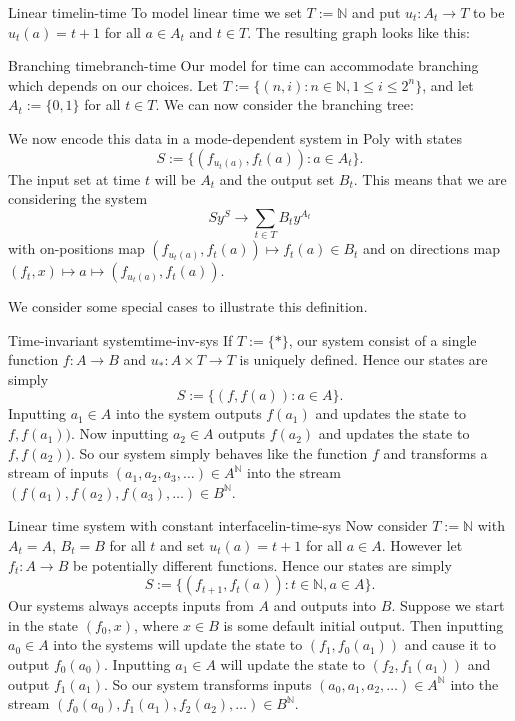 \documentclass[12pt, a4paper]{article}
\theoremstyle{definition}
\theoremstyle{plain}
\theoremstyle{plain}
\theoremstyle{plain}
\theoremstyle{plain}
\theoremstyle{plain}
\theoremstyle{remark}
\theoremstyle{remark}
\begin{document}
\begin{tcexample}{Linear time}{lin-time}
    To model linear time we set $T := \mathbb{N}$ and put $u_t : A_t \rightarrow T$ to be $u_t(a) = t+1$ for all $a \in A_t$ and $t \in T$. The resulting graph looks like this:


\end{tcexample}

\begin{tcexample}{Branching time}{branch-time}
    Our model for time can accommodate branching which depends on our choices. Let $T := \{(n,i) : n \in \mathbb{N}, 1 \leq i \leq 2^n \}$, and let $A_t := \{0,1\}$ for all $t \in T$. We can now consider the branching tree:

\end{tcexample}

We now encode this data in a mode-dependent system in \textsf{Poly} with states
$$ S := \{ (f_{u_t(a)}, f_t(a)) : a \in A_t \}.$$
The input set at time $t$ will be $A_t$ and the output set $B_t$. This means that we are considering the system
$$ S y^S \rightarrow \sum_{t \in T} B_t y^{A_t}$$
with on-positions map $(f_{u_t(a)}, f_t(a)) \mapsto f_t(a) \in B_t$ and on directions map $(f_t, x) \mapsto a \mapsto (f_{u_t(a)}, f_t(a))$.

We consider some special cases to illustrate this definition.
\begin{tcexample}{Time-invariant system}{time-inv-sys}
    If $T := \{* \}$, our system consist of a single function $f : A \rightarrow B$ and $u_*: A \times T \rightarrow T$ is uniquely defined. Hence our states are simply $$ S := \{ (f, f(a)) : a \in A\}.$$
    Inputting $a_1 \in A$ into the system outputs $f(a_1)$ and updates the state to $f, f(a_1))$. Now inputting $a_2 \in A$ outputs $f(a_2)$ and updates the state to $f, f(a_2))$. So our system simply behaves like the function $f$ and transforms a stream of inputs $(a_1, a_2, a_3, \ldots) \in A^{\mathbb{N}}$ into the stream $(f(a_1), f(a_2), f(a_3), \ldots)\in B^{\mathbb{N}}$.
\end{tcexample}

\begin{tcexample}{Linear time system with constant interface}{lin-time-sys}
    Now consider $T := \mathbb{N}$ with $A_t = A$, $B_t = B$ for all $t$ and set $u_t(a) = t+1$ for all $a \in A$. However let $f_t: A \rightarrow B$ be potentially different functions. Hence our states are simply $$ S := \{ (f_{t+1}, f_t(a)) : t \in \mathbb{N}, a \in A\}.$$
    Our systems always accepts inputs from $A$ and outputs into $B$. Suppose we start in the state $(f_0,x)$, where $x \in B$ is some default initial output. Then inputting $a_0 \in A$ into the systems will update the state to $(f_1,f_0(a_1))$ and cause it to output $f_0(a_0)$. Inputting $a_1 \in A$ will update the state to $(f_2,f_1(a_1))$ and output $f_1(a_1)$. So our system transforms inputs $(a_0, a_1, a_2, \ldots) \in A^{\mathbb{N}}$ into the stream $(f_0(a_0), f_1(a_1), f_2(a_2), \ldots)\in B^{\mathbb{N}}$.
\end{tcexample}
\end{document}
